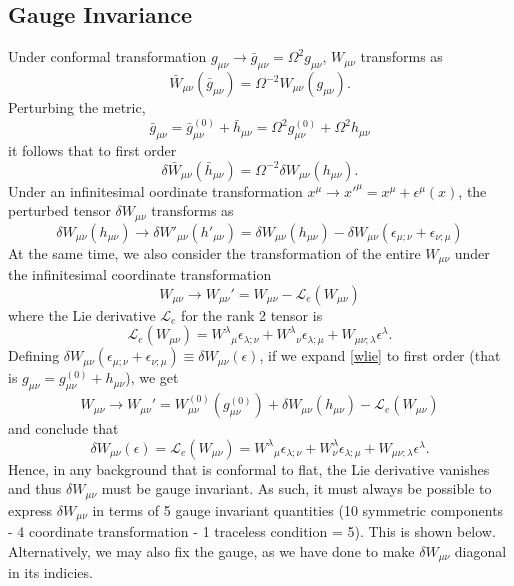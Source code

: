 \documentclass[10pt,letterpaper]{article}
\newcommand{\be}{\begin{equation}} %
\newcommand{\ee}{\end{equation}} %
\newcommand{\ep}{\epsilon}
\numberwithin{equation}{section}
\begin{document}
\subsection{Gauge Invariance}
Under conformal transformation $g_{\mu\nu} \to \bar{g}_{\mu\nu} = \Omega^2 g_{\mu\nu}$, $W_{\mu\nu}$ transforms as
\be
	\bar W_{\mu\nu}(\bar g_{\mu\nu}) =  \Omega^{-2}W_{\mu\nu}(g_{\mu\nu}).
\ee
Perturbing the metric, 
\be
	\bar g_{\mu\nu} = \bar g^{(0)}_{\mu\nu} + \bar h_{\mu\nu} = \Omega^2 g^{(0)}_{\mu\nu} + \Omega^2 h_{\mu\nu}
\ee
it follows that to first order
\be
	\delta \bar W_{\mu\nu}(\bar h_{\mu\nu}) = \Omega^{-2} \delta W_{\mu\nu}(h_{\mu\nu}).
\ee
Under an infinitesimal oordinate transformation $x^\mu \to x'^\mu = x^\mu + \ep^\mu(x)$, the perturbed tensor $\delta W_{\mu\nu}$ transforms as
\be
	\delta W_{\mu\nu}(h_{\mu\nu}) \to \delta W'_{\mu\nu}(h'_{\mu\nu}) = \delta W_{\mu\nu}(h_{\mu\nu}) - \delta W_{\mu\nu}(\ep_{\mu;\nu}+\ep_{\nu;\mu})
\ee
At the same time, we also consider the transformation of the entire $W_{\mu\nu}$ under the infinitesimal coordinate transformation
\be
	W_{\mu\nu} \to W_{\mu\nu}' = W_{\mu\nu} - \mathcal{L}_e( W_{\mu\nu})\label{wlie}
\ee
where the Lie derivative $\mathcal L_e$ for the rank 2 tensor is
\be
	 \mathcal{L}_e( W_{\mu\nu}) = W^{\lambda}{}_\mu \ep_{\lambda;\nu} + W^{\lambda}{}_\nu \ep_{\lambda;\mu} + W_{\mu\nu;\lambda}\ep^\lambda.
\ee
Defining $\delta W_{\mu\nu}(\ep_{\mu;\nu}+\ep_{\nu;\mu}) \equiv \delta W_{\mu\nu}(\ep)$, if we expand \ref{wlie} to first order (that is $g_{\mu\nu} = g^{(0)}_{\mu\nu} + h_{\mu\nu}$), we get
\be
	W_{\mu\nu} \to W_{\mu\nu}' = W^{(0)}_{\mu\nu}(g^{(0)}_{\mu\nu})+ \delta W_{\mu\nu}(h_{\mu\nu})- \mathcal{L}_e( W_{\mu\nu})
\ee
and conclude that
\be
	 \delta W_{\mu\nu}(\ep) =  \mathcal{L}_e( W_{\mu\nu}) = W^{\lambda}{}_\mu \ep_{\lambda;\nu} + W^{\lambda}_\nu \ep_{\lambda;\mu} + W_{\mu\nu;\lambda}\ep^\lambda.
\ee
Hence, in any background that is conformal to flat, the Lie derivative vanishes and thus $\delta W_{\mu\nu}$ must be gauge invariant. As such, it must always be possible to express $\delta W_{\mu\nu}$ in terms of 5 gauge invariant quantities (10 symmetric components - 4 coordinate transformation - 1 traceless condition = 5). This is shown below. Alternatively, we may also fix the gauge, as we have done to make $\delta W_{\mu\nu}$ diagonal in its indicies. 
\\ \\
\end{document}
